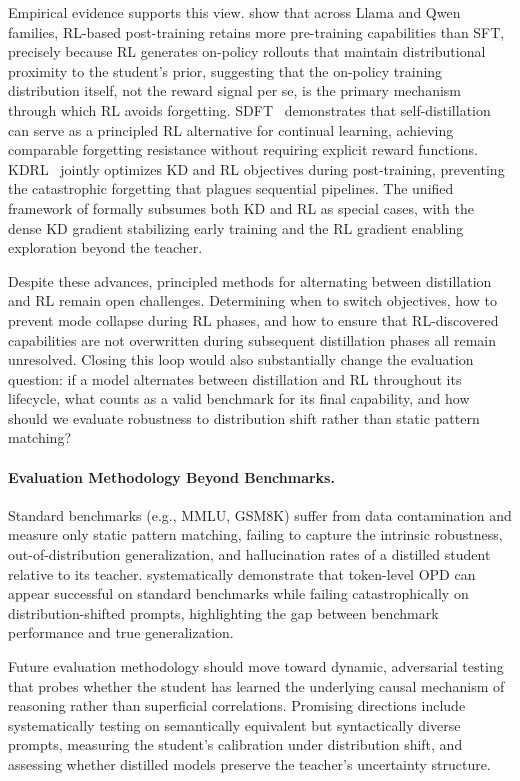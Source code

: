 \documentclass{article} %
\begin{document}
Empirical evidence supports this view. \citet{2510.18874} show that across Llama and Qwen families, RL-based post-training retains more pre-training capabilities than SFT, precisely because RL generates on-policy rollouts that maintain distributional proximity to the student's prior, suggesting that the on-policy training distribution itself, not the reward signal per se, is the primary mechanism through which RL avoids forgetting. SDFT~\citep{2601.19897} demonstrates that self-distillation can serve as a principled RL alternative for continual learning, achieving comparable forgetting resistance without requiring explicit reward functions. KDRL~\citep{2506.02208} jointly optimizes KD and RL objectives during post-training, preventing the catastrophic forgetting that plagues sequential pipelines. The unified framework of \citet{2512.23097} formally subsumes both KD and RL as special cases, with the dense KD gradient stabilizing early training and the RL gradient enabling exploration beyond the teacher.

Despite these advances, principled methods for alternating between distillation and RL remain open challenges. Determining when to switch objectives, how to prevent mode collapse during RL phases, and how to ensure that RL-discovered capabilities are not overwritten during subsequent distillation phases all remain unresolved. Closing this loop would also substantially change the evaluation question: if a model alternates between distillation and RL throughout its lifecycle, what counts as a valid benchmark for its final capability, and how should we evaluate robustness to distribution shift rather than static pattern matching?

\paragraph{Evaluation Methodology Beyond Benchmarks.}
Standard benchmarks (e.g., MMLU, GSM8K) suffer from data contamination and measure only static pattern matching, failing to capture the intrinsic robustness, out-of-distribution generalization, and hallucination rates of a distilled student relative to its teacher. \citet{2603.25562} systematically demonstrate that token-level OPD can appear successful on standard benchmarks while failing catastrophically on distribution-shifted prompts, highlighting the gap between benchmark performance and true generalization.

Future evaluation methodology should move toward dynamic, adversarial testing that probes whether the student has learned the underlying causal mechanism of reasoning rather than superficial correlations. Promising directions include systematically testing on semantically equivalent but syntactically diverse prompts, measuring the student's calibration under distribution shift, and assessing whether distilled models preserve the teacher's uncertainty structure.
\end{document}
